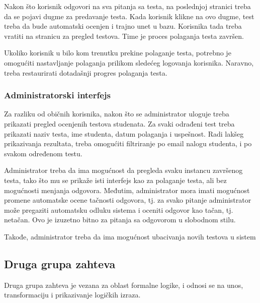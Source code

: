 Nakon što korisnik odgovori na sva pitanja sa testa, na poslednjoj stranici treba da se pojavi dugme za predavanje testa. Kada korisnik klikne na ovo dugme, test treba da bude automatski ocenjen i trajno unet u bazu. Korisnika tada treba vratiti na stranicu za pregled testova. Time je proces polaganja testa završen.

Ukoliko korisnik u bilo kom trenutku prekine polaganje testa, potrebno je omogućiti nastavljanje polaganja prilikom sledećeg logovanja korisnika. Naravno, treba restaurirati dotadašnji progres polaganja testa.

\subsubsection{Administratorski interfejs}
Za razliku od običnih korisnika, nakon što se administrator uloguje treba prikazati pregled ocenjenih testova studenata. Za svaki odrađeni test treba prikazati naziv testa, ime studenta, datum polaganja i uspešnost. Radi lakšeg prikazivanja rezultata, treba omogućiti filtriranje po email nalogu studenta, i po svakom određenom testu.

Administrator treba da ima mogućnost da pregleda svaku instancu završenog testa, tako što mu se prikaže isti interfejs kao za polaganje testa, ali bez mogućnosti menjanja odgovora. Međutim, administrator mora imati mogućnost promene automatske ocene tačnosti odgovora, tj. za svako pitanje administrator može pregaziti automatsku odluku sistema i oceniti odgovor kao tačan, tj. netačan. Ovo je izuzetno bitno za pitanja sa odgovorom u slobodnom stilu.

Takođe, administrator treba da ima mogućnost ubacivanja novih testova u sistem

\subsection{Druga grupa zahteva}
Druga grupa zahteva je vezana za oblast formalne logike, i odnosi se na unos, transformaciju i prikazivanje logičkih izraza.

